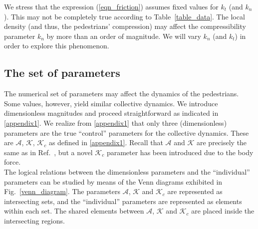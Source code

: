 \documentclass[preprint,12pt]{elsarticle}
\begin{document}
We stress that the expression (\ref{eqn_friction}) assumes fixed values for
$k_t$ (and $k_n$). This may not be completely true according to
Table~\ref{table_data}. The local density (and thus, the pedestrians'
compression) may affect the compressibility parameter $k_n$ by more than an
order  of magnitude. We will vary $k_n$ (and $k_t$) in order to explore this
phenomenon. \\


\subsection{\label{parameters}The set of parameters}

The numerical set of parameters may affect the dynamics of the  pedestrians.
Some values, however, yield similar collective dynamics. We introduce
dimensionless magnitudes  and proceed straightforward as indicated in
\ref{appendix1}. We realize from  \ref{appendix1} that only three
(dimensionless) parameters  are the true  ``control'' parameters for the
collective dynamics. These are $\mathcal{A}$,  $\mathcal{K}$, $\mathcal{K}_c$ as
defined in \ref{appendix1}. Recall that  $\mathcal{A}$ and $\mathcal{K}$ are
precisely the same as in  Ref.~\cite{dorso_2019}, but a novel $\mathcal{K}_c$
parameter has been  introduced due to the body force.   \\

The logical relations between the dimensionless parameters and the
``individual''  parameters can be studied by means of the Venn diagrams
exhibited in  Fig.~\ref{venn_diagram}. The parameters $\mathcal{A}$,
$\mathcal{K}$ and  $\mathcal{K}_c$ are represented as intersecting sets, and the
``individual''  parameters are represented as elements within each set. The
shared elements  between $\mathcal{A}$, $\mathcal{K}$ and $\mathcal{K}_c$ are
placed inside the  intersecting regions. \\
\end{document}
